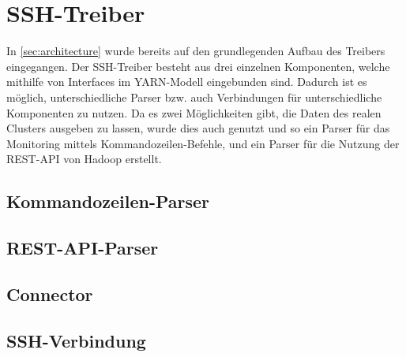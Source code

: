 \section{SSH-Treiber}\label{sec:sshDriver}

In \autoref{sec:architecture} wurde bereits auf den grundlegenden Aufbau des Treibers eingegangen. Der SSH-Treiber besteht aus drei einzelnen Komponenten, welche mithilfe von Interfaces im YARN-Modell eingebunden sind. Dadurch ist es möglich, unterschiedliche Parser bzw. auch Verbindungen für unterschiedliche Komponenten zu nutzen. Da es zwei Möglichkeiten gibt, die Daten des realen Clusters ausgeben zu lassen, wurde dies auch genutzt und so ein Parser für das Monitoring mittels Kommandozeilen-Befehle, und ein Parser für die Nutzung der REST-API von Hadoop erstellt.

\subsection{Kommandozeilen-Parser}\label{sec:cmdParser}


\subsection{REST-API-Parser}\label{sec:restParser}


\subsection{Connector}\label{sec:Connector}


\subsection{SSH-Verbindung}\label{sec:sshConnection}

